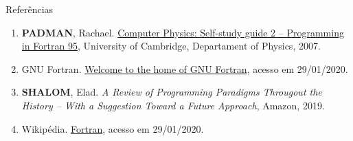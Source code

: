\begin{frame}[fragile]{Referências}

    \begin{enumerate}

        \item \textbf{PADMAN}, Rachael. \href{http://www.mrao.cam.ac.uk/~rachael/compphys/SelfStudyF95.pdf}{Computer Physics: Self-study guide 2 -- Programming in Fortran 95}, University of 
        Cambridge, Departament of Physics, 2007.

        \item GNU Fortran. \href{https://gcc.gnu.org/fortran/}{Welcome to the home of GNU Fortran},
            acesso em 29/01/2020.
 
        \item \textbf{SHALOM}, Elad. \textit{A Review of Programming Paradigms Througout the 
            History -- With a Suggestion Toward a Future Approach}, Amazon, 2019.

        \item Wikipédia. \href{https://pt.wikipedia.org/wiki/Fortran}{Fortran}, acesso em 
            29/01/2020.
 
    \end{enumerate}

\end{frame}
